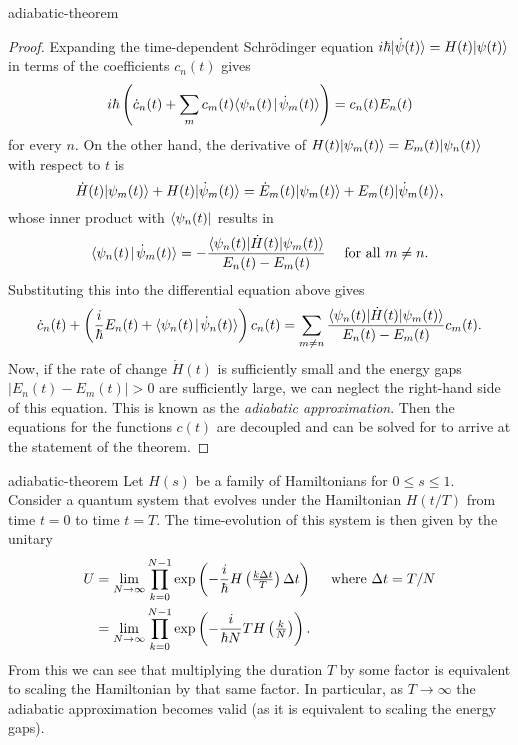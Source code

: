 \begin{example}{adiabatic-theorem}
    \begin{proof}
        Expanding the time-dependent Schrödinger equation $i \hbar |\dot{\psi}(t)\rangle = H(t) |\psi(t)\rangle$ in terms of the coefficients $c_n(t)$ gives
        \[ i \hbar \left( \dot{c}_n(t) + \sum_{m} c_m(t) \langle\psi_n(t)\!\mid\!\dot{\psi}_m(t)\rangle \right) = c_n(t) E_n(t) \]
        for every $n$. On the other hand, the derivative of $H(t) |\psi_m(t)\rangle = E_m(t) |\psi_n(t)\rangle$ with respect to $t$ is
        \[ \dot{H}(t) |\psi_m(t)\rangle + H(t) |\dot{\psi}_m(t)\rangle = \dot{E}_m(t) |\psi_m(t)\rangle + E_m(t) |\dot{\psi}_m(t)\rangle , \]
        whose inner product with $\langle\psi_n(t)|$ results in
        \[ \langle\psi_n(t)\!\mid\!\dot{\psi}_m(t)\rangle = - \frac{\langle\psi_n(t)| \dot{H}(t) |\psi_m(t)\rangle}{E_n(t) - E_m(t)} \quad \textup{ for all } m \ne n . \]
        Substituting this into the differential equation above gives
        \[ \dot{c}_n(t) + \left( \frac{i}{\hbar} E_n(t) + \langle\psi_n(t)\!\mid\!\dot{\psi}_n(t)\rangle \right) c_n(t) = \sum_{m \ne n} \frac{\langle\psi_n(t)| \dot{H}(t) |\psi_m(t)\rangle}{E_n(t) - E_m(t)} c_m(t) . \]
        Now, if the rate of change $\dot{H}(t)$ is sufficiently small and the energy gaps $|E_n(t) - E_m(t)| > 0$ are sufficiently large, we can neglect the right-hand side of this equation. This is known as the \textit{adiabatic approximation}. Then the equations for the functions $c(t)$ are decoupled and can be solved for to arrive at the statement of the theorem.
    \end{proof}
\end{example}

\begin{example}{adiabatic-theorem}
    Let $H(s)$ be a family of Hamiltonians for $0 \le s \le 1$. Consider a quantum system that evolves under the Hamiltonian $H(t/T)$ from time $t = 0$ to time $t = T$. The time-evolution of this system is then given by the unitary
    \[ \begin{aligned}
        U &= \lim_{N \to \infty} \prod_{k = 0}^{N - 1} \exp \left( - \frac{i}{\hbar} H \left(\tfrac{k \Delta t}{T} \right) \Delta t \right) \quad \textup{ where } \Delta t = T / N \\
        &= \lim_{N \to \infty} \prod_{k = 0}^{N - 1} \exp \left( - \frac{i}{\hbar N} T H \left(\tfrac{k}{N} \right) \right) . 
    \end{aligned} \]
    From this we can see that multiplying the duration $T$ by some factor is equivalent to scaling the Hamiltonian by that same factor. In particular, as $T \to \infty$ the adiabatic approximation becomes valid (as it is equivalent to scaling the energy gaps). 
\end{example}
